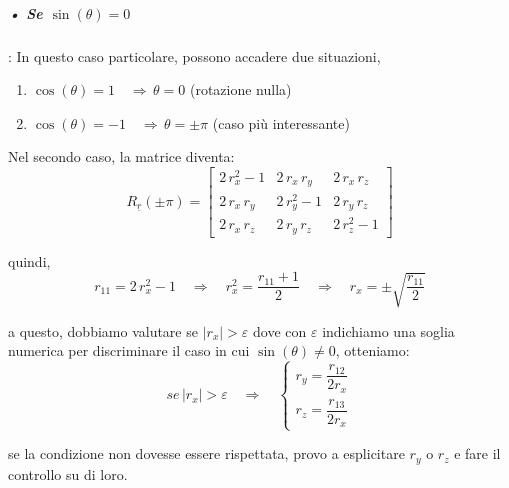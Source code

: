 \subparagraph{• Se $\sin(\theta) = 0$}:
In questo caso particolare, possono accadere due situazioni,

\begin{enumerate}
	\item $\cos(\theta) = 1 \quad \Rightarrow \,\theta = 0$ (rotazione nulla) 
	\item $\cos(\theta) = -1 \quad \Rightarrow \,\theta = \pm \pi $ (caso più interessante)
\end{enumerate}

Nel secondo caso, la matrice diventa:
\begin{equation}
	R_{\underline{r}}(\pm \pi) = 
	\begin{bmatrix}
		2\,r_x^2 - 1 & 2\,r_x\,r_y & 2\,r_x\,r_z \\	
		2\,r_x\,r_y & 2\,r_y^2 - 1 & 2\,r_y\,r_z \\
		2\,r_x\,r_z & 2\,r_y\,r_z &  2\,r_z^2 - 1
	\end{bmatrix}	 
\end{equation}

quindi, 
\begin{equation}
	r_{11} = 2\,r_x^2 - 1 \quad \Rightarrow \quad r_x^2 = \dfrac{r_{11}+1}{2} \quad\Rightarrow \quad r_x = \pm \sqrt{\dfrac{r_{11}}{2}}
\end{equation}

a questo, dobbiamo valutare se $\vert r_x \vert > \varepsilon$ dove con $\varepsilon$ indichiamo una soglia numerica per discriminare il caso in cui $\sin(\theta) \neq 0$, otteniamo:
\begin{equation*}
	se\,\vert r_x \vert > \varepsilon \quad \Rightarrow \quad 
	\begin{cases}
		r_y = \dfrac{r_{12}}{2r_x} \\
		r_z =\dfrac{r_{13}}{2r_x}
	\end{cases}	
\end{equation*}

se la condizione non dovesse essere rispettata, provo a esplicitare $r_y$ o $r_z$ e fare il controllo su di loro.
\newpage

